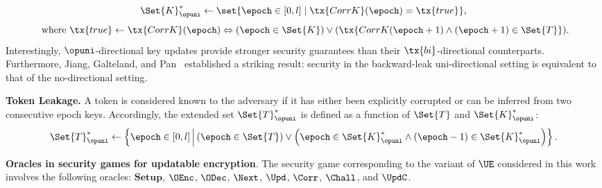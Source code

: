 \documentclass{fundam}
\begin{document}
$$\Set{K}_{\opuni}^{*}\gets \set{\epoch\in [0,l]\mid \tx{CorrK}(\epoch)=\tx{true}},$$ $$ \text{ where } \tx{true}\gets\tx{CorrK}(\epoch)\Leftrightarrow (\epoch \in\Set{K}) \lor (\tx{CorrK(\epoch +1 )\land (\epoch +1 )\in \Set{T}}).$$
Interestingly, $\opuni$-directional key updates provide stronger security guarantees than their $\tx{bi}$-directional counterparts. Furthermore, Jiang, Galteland, and Pan~\cite{jiang2023backward} established a striking result: security in the backward-leak uni-directional setting is equivalent to that of the no-directional setting.


\vspace{0.3cm}
\noindent\textbf{Token Leakage.} A token is considered known to the adversary if it has either been explicitly corrupted or can be inferred from two consecutive epoch keys. Accordingly, the extended set $\Set{T}_{\opuni}^{*}$ is defined as a function of $\Set{T}$ and $\Set{K}_{\opuni}^{*}$:
\[
\Set{T}_{\opuni}^{*} \gets \left\{ \epoch \in [0, l] \,\middle|\, (\epoch \in \Set{T}) \lor \left(\epoch \in \Set{K}_{\opuni}^{*} \land (\epoch - 1) \in \Set{K}_{\opuni}^{*} \right) \right\}.
\]


\vspace{0.3cm}
\noindent\textbf{Oracles in security games for updatable encryption}. The security game corresponding to the variant of $\UE$ considered in this work involves the following oracles: $\mathbf{Setup}$, $\OEnc$, $\ODec$, $\Next$, $\Upd$, $\Corr$, $\Chall$, and $\UpdC$.

\vspace{0.5cm}
\end{document}
